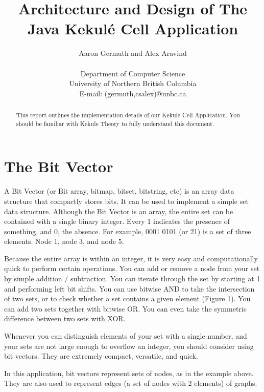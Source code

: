 \documentclass[12pt]{article}
\begin{document}
\title{Architecture and Design of The Java Kekul\'e Cell Application}
\author{Aaron Germuth and Alex Aravind \\\\  
Department of Computer Science \\
University of Northern British Columbia \\
E-mail: (germuth,csalex)@unbc.ca}
\maketitle


\begin{abstract}

This report outlines the implementation details of our Kekule Cell Application. You should be familiar with Kekule Theory \cite{H13, HH13} to fully understand this document.

\end{abstract}

\section{The Bit Vector}

A Bit Vector (or Bit array, bitmap, bitset, bitstring, etc) is an array data structure that compactly stores bits. It can be used to implement a simple set data structure. Although the Bit Vector is an array, the entire set can be contained with a single binary integer. Every 1 indicates the presence of something, and 0, the absence. For example, 0001 0101 (or 21) is a set of three elements. Node 1, node 3, and node 5. 

Because the entire array is within an integer, it is very easy and computationally quick to perform certain operations. You can add or remove a node from your set by simple addition / subtraction. You can iterate through the set by starting at 1 and performing left bit shifts. You can use bitwise AND to take the intersection of two sets, or to check whether a set contains a given element (Figure 1). You can add two sets together with bitwise OR. You can even take the symmetric difference between two sets with XOR.

Whenever you can distinguish elements of your set with a single number, and your sets are not large enough to overflow an integer, you should consider using bit vectors. They are extremely compact, versatile, and quick.

In this application, bit vectors represent sets of nodes, as in the example above. They are also used to represent edges (a set of nodes with 2 elements) of graphs. 
\end{document}
